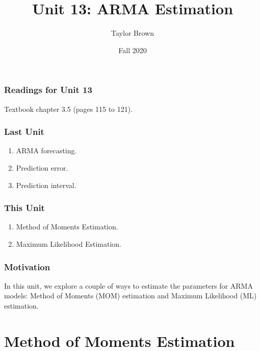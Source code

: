 \documentclass[%
xcolor=pdftex]{beamer}
\title{Unit 13: ARMA Estimation}
\author[STAT 5170: Applied Time Series, Unit 13]{Taylor Brown}
\institute{Department of Statistics, University of Virginia}
\date{Fall 2020}
\begin{document}
\frame{\titlepage}


\begin{frame}
\frametitle{Readings for Unit 13}

Textbook chapter 3.5 (pages 115 to 121).

\end{frame}



\begin{frame}
\frametitle{Last Unit}
\begin{enumerate}
\item ARMA forecasting.
\item Prediction error.
\item Prediction interval.
\end{enumerate}
\end{frame}

\begin{frame}
\frametitle{This Unit}
\begin{enumerate}
\item Method of Moments Estimation.
\item Maximum Likelihood Estimation.
\end{enumerate}
\end{frame}


\begin{frame}
\frametitle{Motivation}

In this unit, we explore a couple of ways to estimate the parameters for ARMA models: Method of Moments (MOM) estimation and Maximum Likelihood (ML) estimation.

\end{frame}

\section{Method of Moments Estimation}
\frame{\tableofcontents[currentsection]}

%
%
%
%
\end{document}
